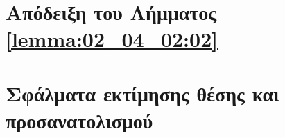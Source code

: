 \section{Απόδειξη του Λήμματος \ref{lemma:02_04_02:02}}
  \label{appendix:04:lemma_01_proof}
  


\section{Σφάλματα εκτίμησης θέσης και προσανατολισμού}
  \label{appendix:04:pos_orient_errors}
  
